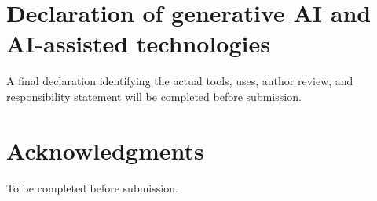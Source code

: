 \documentclass[preprint,12pt]{elsarticle}
\begin{document}
\section*{Declaration of generative AI and AI-assisted technologies}

A final declaration identifying the actual tools, uses, author review, and
responsibility statement will be completed before submission.

\section*{Acknowledgments}

To be completed before submission.



\end{document}
